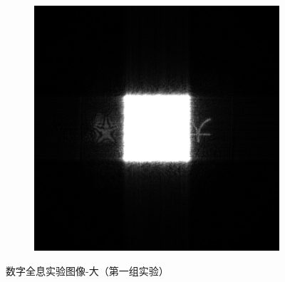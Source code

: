 \documentclass{ctexart}
\begin{document}
\begin{figure}[H]
\begin{subfigure}{.48\textwidth}
    \includegraphics[width=\linewidth]{数字全息实验数据/数字全息/大1/数字全息输出结果-大1.jpg}
  \end{subfigure}
  \caption{数字全息实验图像-大（第一组实验）}
\end{figure}
\end{document}
